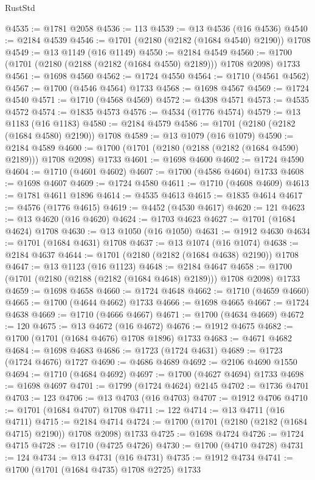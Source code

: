 \begin{lexlean}{RustStd}
\begin{coremodule}
@4535 := @1781 @2058
@4536 := 113
@4539 := @13 @4536 (@16 @4536)
@4540 := @2184 @4539
@4546 := @1701 (@2180 (@2182 (@1684 @4540) @2190)) @1708
@4549 := @13 @1149 (@16 @1149)
@4550 := @2184 @4549
@4560 := @1700 (@1701 (@2180 (@2188 (@2182 (@1684 @4550) @2189))) @1708 @2098) @1733
@4561 := @1698 @4560
@4562 := @1724 @4550
@4564 := @1710 (@4561 @4562)
@4567 := @1700 (@4546 @4564) @1733
@4568 := @1698 @4567
@4569 := @1724 @4540
@4571 := @1710 (@4568 @4569)
@4572 := @4398 @4571
@4573 := @4535 @4572
@4574 := @1835 @4573
@4576 := @4534 (@1776 @4574)
@4579 := @13 @1183 (@16 @1183)
@4580 := @2184 @4579
@4586 := @1701 (@2180 (@2182 (@1684 @4580) @2190)) @1708
@4589 := @13 @1079 (@16 @1079)
@4590 := @2184 @4589
@4600 := @1700 (@1701 (@2180 (@2188 (@2182 (@1684 @4590) @2189))) @1708 @2098) @1733
@4601 := @1698 @4600
@4602 := @1724 @4590
@4604 := @1710 (@4601 @4602)
@4607 := @1700 (@4586 @4604) @1733
@4608 := @1698 @4607
@4609 := @1724 @4580
@4611 := @1710 (@4608 @4609)
@4613 := @1781 @4611 @1896
@4614 := @4535 @4613
@4615 := @1835 @4614
@4617 := @4576 (@1776 @4615)
@4619 := @4452 (@4530 @4617)
@4620 := 121
@4623 := @13 @4620 (@16 @4620)
@4624 := @1703 @4623
@4627 := @1701 (@1684 @4624) @1708
@4630 := @13 @1050 (@16 @1050)
@4631 := @1912 @4630
@4634 := @1701 (@1684 @4631) @1708
@4637 := @13 @1074 (@16 @1074)
@4638 := @2184 @4637
@4644 := @1701 (@2180 (@2182 (@1684 @4638) @2190)) @1708
@4647 := @13 @1123 (@16 @1123)
@4648 := @2184 @4647
@4658 := @1700 (@1701 (@2180 (@2188 (@2182 (@1684 @4648) @2189))) @1708 @2098) @1733
@4659 := @1698 @4658
@4660 := @1724 @4648
@4662 := @1710 (@4659 @4660)
@4665 := @1700 (@4644 @4662) @1733
@4666 := @1698 @4665
@4667 := @1724 @4638
@4669 := @1710 (@4666 @4667)
@4671 := @1700 (@4634 @4669)
@4672 := 120
@4675 := @13 @4672 (@16 @4672)
@4676 := @1912 @4675
@4682 := @1700 (@1701 (@1684 @4676) @1708 @1896) @1733
@4683 := @4671 @4682
@4684 := @1698 @4683
@4686 := @1723 (@1724 @4631)
@4689 := @1723 (@1724 @4676) @1727
@4690 := @4686 @4689
@4692 := @2106 @4690 @1550
@4694 := @1710 (@4684 @4692)
@4697 := @1700 (@4627 @4694) @1733
@4698 := @1698 @4697
@4701 := @1799 (@1724 @4624) @2145
@4702 := @1736 @4701
@4703 := 123
@4706 := @13 @4703 (@16 @4703)
@4707 := @1912 @4706
@4710 := @1701 (@1684 @4707) @1708
@4711 := 122
@4714 := @13 @4711 (@16 @4711)
@4715 := @2184 @4714
@4724 := @1700 (@1701 (@2180 (@2182 (@1684 @4715) @2190)) @1708 @2098) @1733
@4725 := @1698 @4724
@4726 := @1724 @4715
@4728 := @1710 (@4725 @4726)
@4730 := @1700 (@4710 @4728)
@4731 := 124
@4734 := @13 @4731 (@16 @4731)
@4735 := @1912 @4734
@4741 := @1700 (@1701 (@1684 @4735) @1708 @2725) @1733

\end{coremodule}
\end{lexlean}
